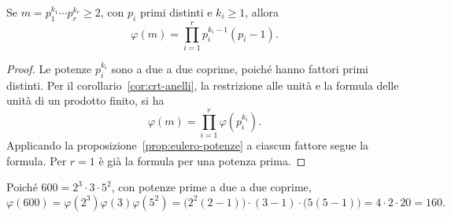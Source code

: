 \begin{corollario}
Se $m=p_1^{k_1}\cdots p_r^{k_r}\ge2$, con $p_i$ primi distinti e $k_i\ge1$, allora
\[
\varphi(m)=\prod_{i=1}^r p_i^{k_i-1}(p_i-1).
\]
\end{corollario}
\begin{proof}
Le potenze $p_i^{k_i}$ sono a due a due coprime, poiché hanno fattori primi distinti. Per il corollario~\ref{cor:crt-anelli}, la restrizione alle unità e la formula delle unità di un prodotto finito, si ha
\[
\varphi(m)=\prod_{i=1}^r\varphi(p_i^{k_i}).
\]
Applicando la proposizione~\ref{prop:eulero-potenze} a ciascun fattore segue la formula. Per $r=1$ è già la formula per una potenza prima.
\end{proof}

\begin{esempio}
Poiché $600=2^3\cdot3\cdot5^2$, con potenze prime a due a due coprime,
\[
\varphi(600)=\varphi(2^3)\varphi(3)\varphi(5^2)
           =\bigl(2^2(2-1)\bigr)\cdot(3-1)\cdot\bigl(5(5-1)\bigr)
           =4\cdot2\cdot20=160.
\]
\end{esempio}
